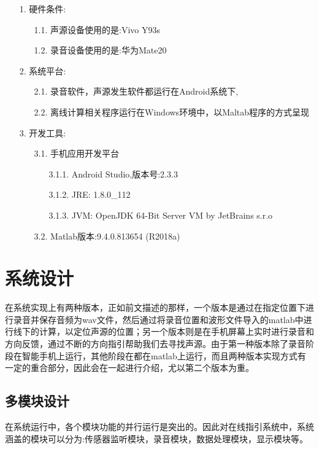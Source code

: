 \documentclass[winfonts]{njuthesis}
\begin{document}
		\begin{enumerate}
			\item[1.] 硬件条件:
				\begin{enumerate}
					\item[1.1.] 声源设备使用的是:Vivo Y93s
					\item[1.2.] 录音设备使用的是:华为Mate20
				\end{enumerate}
			\item[2.] 系统平台:
				\begin{enumerate}
					\item[2.1.] 录音软件，声源发生软件都运行在Android系统下,
					\item[2.2.] 离线计算相关程序运行在Windows环境中，以Maltab程序的方式呈现	
				\end{enumerate}
			\item[3.] 开发工具:
				\begin{enumerate}
					\item[3.1.] 手机应用开发平台
						\begin{enumerate}
							\item[3.1.1.] Android Studio,版本号:2.3.3
							\item[3.1.2.] JRE: 1.8.0\_112
							\item[3.1.3.] JVM: OpenJDK 64-Bit Server VM by JetBrains s.r.o		
						\end{enumerate}			
					\item[3.2.] Matlab版本:9.4.0.813654 (R2018a)
				\end{enumerate}	
		\end{enumerate}
	
	\section{系统设计}
	
		在系统实现上有两种版本，正如前文描述的那样，一个版本是通过在指定位置下进行录音并保存音频为wav文件，然后通过将录音位置和波形文件导入的matlab中进行线下的计算，以定位声源的位置；另一个版本则是在手机屏幕上实时进行录音和方向反馈，通过不断的方向指引帮助我们去寻找声源。由于第一种版本除了录音阶段在智能手机上运行，其他阶段在都在matlab上运行，而且两种版本实现方式有一定的重合部分，因此会在一起进行介绍，尤以第二个版本为重。
		
		\subsection{多模块设计}
		
			在系统运行中，各个模块功能的并行运行是突出的。因此对在线指引系统中，系统涵盖的模块可以分为:传感器监听模块，录音模块，数据处理模块，显示模块等。
			
\end{document}

